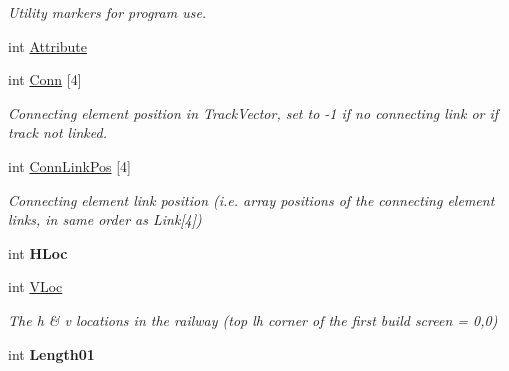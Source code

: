\begin{DoxyCompactItemize}
\begin{DoxyCompactList}\small\item\em Utility markers for program use. \end{DoxyCompactList}\item 
int \mbox{\hyperlink{class_t_track_element_a16594caf5c9e6a35bd4120ad639b8cc2}{Attribute}}
\item 
\mbox{\label{class_t_track_element_a9551c6d789485c121203be6d51e4781f}} 
int \mbox{\hyperlink{class_t_track_element_a9551c6d789485c121203be6d51e4781f}{Conn}} \mbox{[}4\mbox{]}
\begin{DoxyCompactList}\small\item\em Connecting element position in Track\+Vector, set to -\/1 if no connecting link or if track not linked. \end{DoxyCompactList}\item 
\mbox{\label{class_t_track_element_a93a9094a1833fced2891c012bc46a4ea}} 
int \mbox{\hyperlink{class_t_track_element_a93a9094a1833fced2891c012bc46a4ea}{Conn\+Link\+Pos}} \mbox{[}4\mbox{]}
\begin{DoxyCompactList}\small\item\em Connecting element link position (i.\+e. array positions of the connecting element links, in same order as Link\mbox{[}4\mbox{]}) \end{DoxyCompactList}\item 
\mbox{\label{class_t_track_element_a0d0e30d5e7b76d90fb737316d50efdd0}} 
int {\bfseries H\+Loc}
\item 
\mbox{\label{class_t_track_element_a0d9a1c95d1c1aedd0ffec4d24772cfbc}} 
int \mbox{\hyperlink{class_t_track_element_a0d9a1c95d1c1aedd0ffec4d24772cfbc}{V\+Loc}}
\begin{DoxyCompactList}\small\item\em The h \& v locations in the railway (top lh corner of the first build screen = 0,0) \end{DoxyCompactList}\item 
\mbox{\label{class_t_track_element_a63978116296522c989ee9e4257988ce6}} 
int {\bfseries Length01}
\item 
\mbox{\label{class_t_track_element_ad37f3272aa6ca0329b55e4ec383ec5d2}} 

\end{DoxyCompactItemize}
